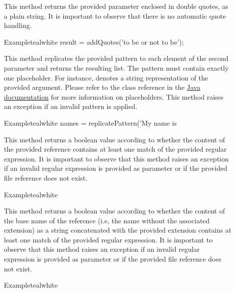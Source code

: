 \begin{description}
\item[] This method returns the provided parameter enclosed in double quotes, as a plain string. It is important to observe that there is no automatic quote handling.

\begin{codebox}{Example}{teal}{\icnote}{white}
result = addQuotes('to be or not to be');
\end{codebox}

\item[] This method replicates the provided pattern to each element of the second parameter and returns the resulting list. The pattern must contain exactly one placeholder. For instance,  denotes a string representation of the provided argument. Please refer to the  class reference in the \href{https://docs.oracle.com/javase/7/docs/api/java/util/Formatter.html}{Java documentation} for more information on placeholders. This method raises an exception if an invalid pattern is applied.

\begin{codebox}{Example}{teal}{\icnote}{white}
names = replicatePattern('My name is %
\end{codebox}

\item[] This method returns a boolean value according to whether the content of the provided  reference contains at least one match of the provided  regular expression. It is important to observe that this method raises an exception if an invalid regular expression is provided as parameter or if the provided file reference does not exist.

\begin{codebox}{Example}{teal}{\icnote}{white}
\end{codebox}

\item[] This method returns a boolean value according to whether the content of the base name of the  reference (i.e, the name without the associated extension) as a string concatenated with the provided  extension contains at least one match of the provided  regular expression. It is important to observe that this method raises an exception if an invalid regular expression is provided as parameter or if the provided file reference does not exist.

\begin{codebox}{Example}{teal}{\icnote}{white}
\end{codebox}
\end{description}


